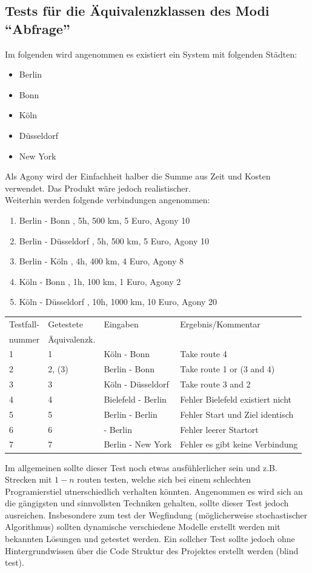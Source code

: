 \documentclass[a4paper]{report}
\begin{document}
\subsection*{Tests für die Äquivalenzklassen des Modi ``Abfrage''}
Im folgenden wird angenommen es existiert ein System mit folgenden Städten:
\begin{itemize}
 \item Berlin
 \item Bonn
 \item Köln
 \item Düsseldorf
 \item New York
\end{itemize}
Als Agony wird der Einfachheit halber die Summe aus Zeit und Kosten verwendet. Das Produkt wäre jedoch realistischer.\\
Weiterhin werden folgende verbindungen angenommen:
\begin{enumerate}
 \item Berlin - Bonn , 5h, 500 km, 5 Euro, Agony 10 
 \item Berlin - Düsseldorf , 5h, 500 km, 5 Euro, Agony 10
 \item Berlin - Köln , 4h, 400 km, 4 Euro, Agony 8
 \item Köln - Bonn , 1h, 100 km, 1 Euro, Agony 2
 \item Köln - Düsseldorf , 10h, 1000 km, 10 Euro, Agony 20
 \end{enumerate}


\begin{tabular}{|l|l|l|l|}
\hline
Testfall- 	& Getestete 		& Eingaben 	& Ergebnis/Kommentar\\
nummer		& Äquivalenzk.		& 		&\\
\hline
1		& 1			& Köln - Bonn		& Take route 4 \\
2		& 2, (3)		& Berlin - Bonn		& Take route 1 or (3 and 4)\\
3		& 3			& Köln - Düsseldorf 	& Take route 3 and 2 \\
4		& 4			& Bielefeld - Berlin 	& Fehler Bielefeld existiert nicht\\
5		& 5			& Berlin - Berlin	& Fehler Start und Ziel identisch\\ 
6		& 6			&  - Berlin		& Fehler leerer Startort\\
7		& 7			& Berlin - New York	& Fehler es gibt keine Verbindung\\
\hline
\end{tabular}
Im allgemeinen sollte dieser Test noch etwas ausfühlerlicher sein und z.B. Strecken mit $1-n$ routen testen, welche sich bei einem schlechten Programierstiel utnerschiedlich verhalten könnten. Angenommen es wird sich an die gängigsten und sinnvollsten Techniken gehalten, sollte dieser Test jedoch ausreichen. Insbesondere zum test der Wegfindung (möglicherweise stochastischer Algorithmus) sollten dynamische verschiedene Modelle erstellt werden mit bekannten Lösungen und getestet werden. Ein sollcher Test sollte jedoch ohne Hintergrundwissen über die Code Struktur des Projektes erstellt werden (blind test). 
\end{document}
